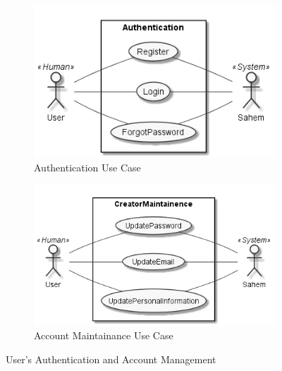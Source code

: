 \begin{figure}
      \centering
      \begin{subfigure}[b]{0.45\textwidth}
          \centering
          \includegraphics[width=\textwidth]{assets/user_maintainence.png}
          \caption{Authentication Use Case}
          \label{fig: authentication uc}
      \end{subfigure}
      \hfill
      \begin{subfigure}[b]{0.45\textwidth}
          \centering
          \includegraphics[width=\textwidth]{assets/CreatorMaintainence.png}
          \caption{Account Maintainance Use Case}
          \label{fig:account maintainence uc}
      \end{subfigure}
         \caption{User’s Authentication and Account Management}
         \label{fig:user authentication and account management ucs}
 \end{figure}



